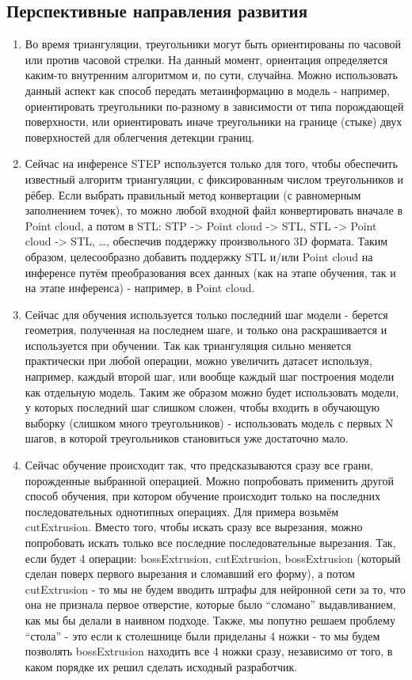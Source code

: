 \subsection{Перспективные направления развития}
\begin{enumerate}
    \item Во время триангуляции, треугольники могут быть ориентированы по часовой или против часовой стрелки. На данный момент, ориентация определяется каким-то внутренним алгоритмом и, по сути, случайна. Можно использовать данный аспект как способ передать метаинформацию в модель - например, ориентировать треугольники по-разному в зависимости от типа порождающей поверхности, или ориентировать иначе треугольники на границе (стыке) двух поверхностей для облегчения детекции границ.
    \item Сейчас на инференсе STEP используется только для того, чтобы обеспечить известный алгоритм триангуляции, с фиксированным числом треугольников и рёбер. Если выбрать правильный метод конвертации (с равномерным заполнением точек), то можно любой входной файл конвертировать вначале в Point cloud, а потом в STL: STP -> Point cloud -> STL, STL -> Point cloud -> STL, …, обеспечив поддержку произвольного 3D формата. Таким образом, целесообразно добавить поддержку STL и/или Point cloud на инференсе путём преобразования всех данных (как на этапе обучения, так и на этапе инференса) - например, в Point cloud.
    \item Сейчас для обучения используется только последний шаг модели - берется геометрия, полученная на последнем шаге, и только она раскрашивается и используется при обучении. Так как триангуляция сильно меняется практически при любой операции, можно увеличить датасет используя, например, каждый второй шаг, или вообще каждый шаг построения модели как отдельную модель. Таким же образом можно будет использовать модели, у которых последний шаг слишком сложен, чтобы входить в обучающую выборку (слишком много треугольников) - использовать модель с первых N шагов, в которой треугольников становиться уже достаточно мало.
    \item Сейчас обучение происходит так, что предсказываются сразу все грани, порожденные выбранной операцией. Можно попробовать применить другой способ обучения, при котором обучение происходит только на последних последовательных однотипных операциях. Для примера возьмём cutExtrusion. Вместо того, чтобы искать сразу все вырезания, можно попробовать искать только все последние последовательные вырезания. Так, если будет 4 операции: bossExtrusion, cutExtrusion, bossExtrusion (который сделан поверх первого вырезания и сломавший его форму), а потом cutExtrusion - то мы не будем вводить штрафы для нейронной сети за то, что она не признала первое отверстие, которые было “сломано” выдавливанием, как мы бы делали в наивном подходе. Также, мы попутно решаем проблему “стола” - это если к столешнице были приделаны 4 ножки - то мы будем позволять bossExtrusion находить все 4 ножки сразу, независимо от того, в каком порядке их решил сделать исходный разработчик.

\end{enumerate}
